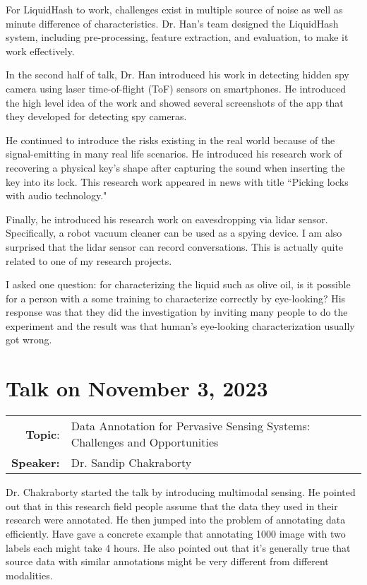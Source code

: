\documentclass[11pt, oneside]{article}   	%
\begin{document}
For LiquidHash to work,  challenges exist in multiple source of noise as well as minute difference of characteristics. Dr. Han's team designed the LiquidHash system, including pre-processing, feature extraction, and evaluation, to make it work effectively.

In the second half of talk, Dr. Han introduced his work in detecting hidden spy camera using laser time-of-flight (ToF) sensors on smartphones. He introduced the high level idea of the work and showed several screenshots of the app that they developed for detecting spy cameras. 

He continued to introduce the risks existing in the real world because of the signal-emitting in many real life scenarios. He introduced his research work of recovering a physical key's shape after capturing the sound when inserting the key into its lock. This research work appeared in news with title ``Picking locks with audio technology."

Finally, he introduced his research work on eavesdropping via lidar sensor. Specifically, a robot vacuum cleaner can be used as a spying device. I am also surprised that the lidar sensor can record conversations. This is actually quite related to one of my research projects.

I asked one question: for characterizing the liquid such as olive oil, is it possible for a person with a some training to characterize correctly by eye-looking? His response was that they did the investigation by inviting many people to do the experiment and the result was that human's eye-looking characterization usually got wrong.


\newpage
\section{Talk on November 3, 2023}
\begin{tabularx} {\textwidth}{r X}
\textbf{Topic}: &Data Annotation for Pervasive Sensing Systems: Challenges and Opportunities\\
\textbf{Speaker:} & Dr. Sandip Chakraborty\\
\end{tabularx}

Dr. Chakraborty started the talk by introducing multimodal sensing. He pointed out that in this research field people assume that the data they used in their research were annotated. He then jumped into the problem of annotating data efficiently. Have gave a concrete example that annotating 1000 image with two labels each might take 4 hours. He also pointed out that it's generally true that source data with similar annotations might be very different from different modalities.
\end{document}
